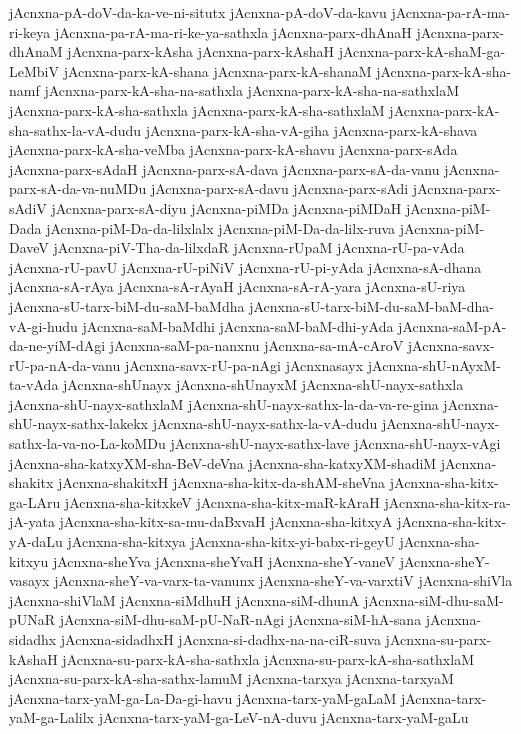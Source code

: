 {jAcnxna-pA-doV-da-ka-ve-ni-situtx
jAcnxna-pA-doV-da-kavu
jAcnxna-pa-rA-ma-ri-keya
jAcnxna-pa-rA-ma-ri-ke-ya-sathxla
jAcnxna-parx-dhAnaH
jAcnxna-parx-dhAnaM
jAcnxna-parx-kAsha
jAcnxna-parx-kAshaH
jAcnxna-parx-kA-shaM-ga-LeMbiV
jAcnxna-parx-kA-shana
jAcnxna-parx-kA-shanaM
jAcnxna-parx-kA-sha-namf
jAcnxna-parx-kA-sha-na-sathxla
jAcnxna-parx-kA-sha-na-sathxlaM
jAcnxna-parx-kA-sha-sathxla
jAcnxna-parx-kA-sha-sathxlaM
jAcnxna-parx-kA-sha-sathx-la-vA-dudu
jAcnxna-parx-kA-sha-vA-giha
jAcnxna-parx-kA-shava
jAcnxna-parx-kA-sha-veMba
jAcnxna-parx-kA-shavu
jAcnxna-parx-sAda
jAcnxna-parx-sAdaH
jAcnxna-parx-sA-dava
jAcnxna-parx-sA-da-vanu
jAcnxna-parx-sA-da-va-nuMDu
jAcnxna-parx-sA-davu
jAcnxna-parx-sAdi
jAcnxna-parx-sAdiV
jAcnxna-parx-sA-diyu
jAcnxna-piMDa
jAcnxna-piMDaH
jAcnxna-piM-Dada
jAcnxna-piM-Da-da-lilxlalx
jAcnxna-piM-Da-da-lilx-ruva
jAcnxna-piM-DaveV
jAcnxna-piV-Tha-da-lilxdaR
jAcnxna-rUpaM
jAcnxna-rU-pa-vAda
jAcnxna-rU-pavU
jAcnxna-rU-piNiV
jAcnxna-rU-pi-yAda
jAcnxna-sA-dhana
jAcnxna-sA-rAya
jAcnxna-sA-rAyaH
jAcnxna-sA-rA-yara
jAcnxna-sU-riya
jAcnxna-sU-tarx-biM-du-saM-baMdha
jAcnxna-sU-tarx-biM-du-saM-baM-dha-vA-gi-hudu
jAcnxna-saM-baMdhi
jAcnxna-saM-baM-dhi-yAda
jAcnxna-saM-pA-da-ne-yiM-dAgi
jAcnxna-saM-pa-nanxnu
jAcnxna-sa-mA-cAroV
jAcnxna-savx-rU-pa-nA-da-vanu
jAcnxna-savx-rU-pa-nAgi
jAcnxnasayx
jAcnxna-shU-nAyxM-ta-vAda
jAcnxna-shUnayx
jAcnxna-shUnayxM
jAcnxna-shU-nayx-sathxla
jAcnxna-shU-nayx-sathxlaM
jAcnxna-shU-nayx-sathx-la-da-va-re-gina
jAcnxna-shU-nayx-sathx-lakekx
jAcnxna-shU-nayx-sathx-la-vA-dudu
jAcnxna-shU-nayx-sathx-la-va-no-La-koMDu
jAcnxna-shU-nayx-sathx-lave
jAcnxna-shU-nayx-vAgi
jAcnxna-sha-katxyXM-sha-BeV-deVna
jAcnxna-sha-katxyXM-shadiM
jAcnxna-shakitx
jAcnxna-shakitxH
jAcnxna-sha-kitx-da-shAM-sheVna
jAcnxna-sha-kitx-ga-LAru
jAcnxna-sha-kitxkeV
jAcnxna-sha-kitx-maR-kAraH
jAcnxna-sha-kitx-ra-jA-yata
jAcnxna-sha-kitx-sa-mu-daBxvaH
jAcnxna-sha-kitxyA
jAcnxna-sha-kitx-yA-daLu
jAcnxna-sha-kitxya
jAcnxna-sha-kitx-yi-babx-ri-geyU
jAcnxna-sha-kitxyu
jAcnxna-sheYva
jAcnxna-sheYvaH
jAcnxna-sheY-vaneV
jAcnxna-sheY-vasayx
jAcnxna-sheY-va-varx-ta-vanunx
jAcnxna-sheY-va-varxtiV
jAcnxna-shiVla
jAcnxna-shiVlaM
jAcnxna-siMdhuH
jAcnxna-siM-dhunA
jAcnxna-siM-dhu-saM-pUNaR
jAcnxna-siM-dhu-saM-pU-NaR-nAgi
jAcnxna-siM-hA-sana
jAcnxna-sidadhx
jAcnxna-sidadhxH
jAcnxna-si-dadhx-na-na-ciR-suva
jAcnxna-su-parx-kAshaH
jAcnxna-su-parx-kA-sha-sathxla
jAcnxna-su-parx-kA-sha-sathxlaM
jAcnxna-su-parx-kA-sha-sathx-lamuM
jAcnxna-tarxya
jAcnxna-tarxyaM
jAcnxna-tarx-yaM-ga-La-Da-gi-havu
jAcnxna-tarx-yaM-gaLaM
jAcnxna-tarx-yaM-ga-Lalilx
jAcnxna-tarx-yaM-ga-LeV-nA-duvu
jAcnxna-tarx-yaM-gaLu
}
